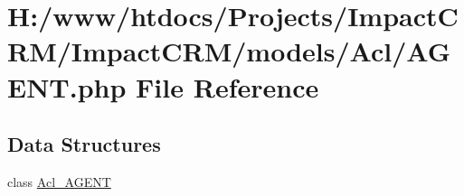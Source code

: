 \hypertarget{AGENT_8php}{
\section{H:/www/htdocs/Projects/ImpactCRM/ImpactCRM/models/Acl/AGENT.php File Reference}
\label{AGENT_8php}
}
\subsection*{Data Structures}
\begin{DoxyCompactItemize}
\item 
class \hyperlink{classAcl__AGENT}{Acl\_\-AGENT}
\end{DoxyCompactItemize}
